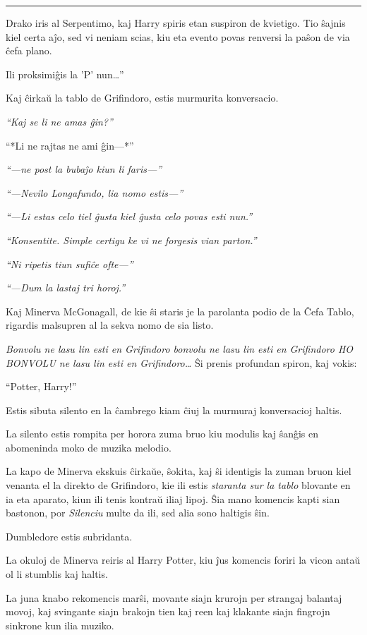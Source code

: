 \begin{center}\rule{3in}{0.4pt}\end{center}

Drako iris al Serpentimo, kaj Harry spiris etan suspiron de
kvietigo. Tio ŝajnis kiel certa aĵo, sed vi neniam scias, kiu eta
evento povas renversi la paŝon de via ĉefa plano.

Ili proksimiĝis la 'P' nun\ldots''

Kaj ĉirkaŭ la tablo de Grifindoro, estis murmurita konversacio.

\emph{``Kaj se li ne amas ĝin?''}

``*Li ne rajtas ne ami ĝin—*''

\emph{``—ne post la bubaĵo kiun li faris—''}

\emph{``—Nevilo Longafundo, lia nomo estis—''}

\emph{``—Li estas celo tiel ĝusta kiel ĝusta celo povas esti nun.''}

\emph{``Konsentite. Simple certigu ke vi ne forgesis vian parton.''}

\emph{``Ni ripetis tiun sufiĉe ofte—''}

\emph{``—Dum la lastaj tri horoj.''}

Kaj Minerva McGonagall, de kie ŝi staris je la parolanta podio de la
Ĉefa Tablo, rigardis malsupren al la sekva nomo de sia listo.

\emph{Bonvolu ne lasu lin esti en Grifindoro bonvolu ne lasu lin esti
  en Grifindoro HO BONVOLU ne lasu lin esti en Grifindoro\ldots} Ŝi
prenis profundan spiron, kaj vokis:

``Potter, Harry!''

Estis sibuta silento en la ĉambrego kiam ĉiuj la murmuraj konversacioj
haltis.

La silento estis rompita per horora zuma bruo kiu modulis kaj ŝanĝis
en abomeninda moko de muzika melodio.

La kapo de Minerva ekskuis ĉirkaŭe, ŝokita, kaj ŝi identigis la zuman
bruon kiel venanta el la direkto de Grifindoro, kie ili estis
\emph{staranta sur la tablo} blovante en ia eta aparato, kiun ili
tenis kontraŭ iliaj lipoj. Ŝia mano komencis kapti sian bastonon, por
\emph{Silenciu} multe da ili, sed alia sono haltigis ŝin.

Dumbledore estis subridanta.

La okuloj de Minerva reiris al Harry Potter, kiu ĵus komencis foriri
la vicon antaŭ ol li stumblis kaj haltis.

La juna knabo rekomencis marŝi, movante siajn krurojn per strangaj
balantaj movoj, kaj svingante siajn brakojn tien kaj reen kaj klakante
siajn fingrojn sinkrone kun ilia muziko.

